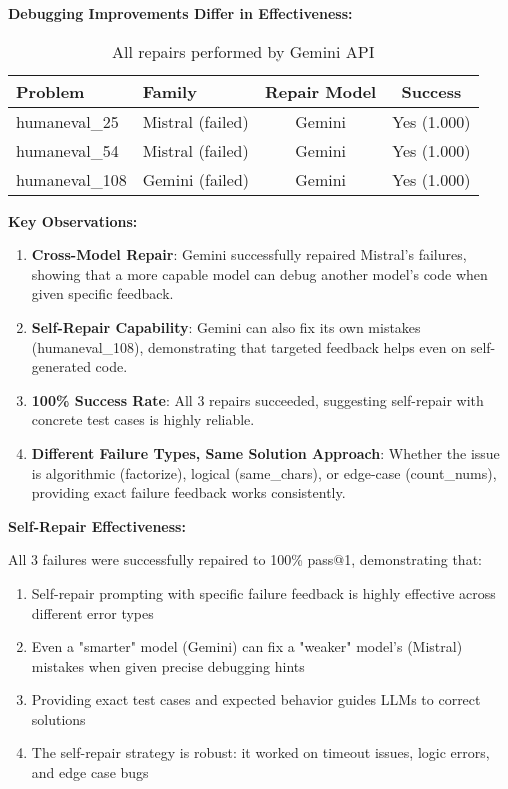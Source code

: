 \documentclass[11pt]{article}
\begin{document}
\textbf{Debugging Improvements Differ in Effectiveness:}

\begin{table}[h]
\centering
\begin{tabular}{llcc}
\toprule
\textbf{Problem} & \textbf{Family} & \textbf{Repair Model} & \textbf{Success} \\
\midrule
humaneval\_25 & Mistral (failed) & Gemini & Yes (1.000) \\
humaneval\_54 & Mistral (failed) & Gemini & Yes (1.000) \\
humaneval\_108 & Gemini (failed) & Gemini & Yes (1.000) \\
\bottomrule
\end{tabular}
\caption{All repairs performed by Gemini API}
\end{table}

\textbf{Key Observations:}
\begin{enumerate}
    \item \textbf{Cross-Model Repair}: Gemini successfully repaired Mistral's failures, showing that a more capable model can debug another model's code when given specific feedback.
    
    \item \textbf{Self-Repair Capability}: Gemini can also fix its own mistakes (humaneval\_108), demonstrating that targeted feedback helps even on self-generated code.
    
    \item \textbf{100\% Success Rate}: All 3 repairs succeeded, suggesting self-repair with concrete test cases is highly reliable.
    
    \item \textbf{Different Failure Types, Same Solution Approach}: Whether the issue is algorithmic (factorize), logical (same\_chars), or edge-case (count\_nums), providing exact failure feedback works consistently.
\end{enumerate}

\textbf{Self-Repair Effectiveness:}

All 3 failures were successfully repaired to 100\% pass@1, demonstrating that:
\begin{enumerate}
    \item Self-repair prompting with specific failure feedback is highly effective across different error types
    \item Even a "smarter" model (Gemini) can fix a "weaker" model's (Mistral) mistakes when given precise debugging hints
    \item Providing exact test cases and expected behavior guides LLMs to correct solutions
    \item The self-repair strategy is robust: it worked on timeout issues, logic errors, and edge case bugs
\end{enumerate}
\end{document}
